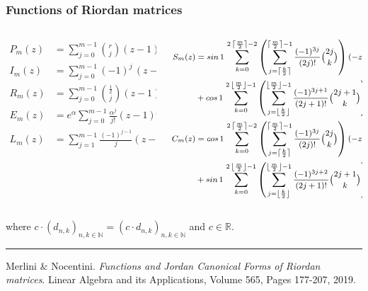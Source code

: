 \documentclass[9pt]{beamer}
\begin{document}
\begin{frame}[fragile]
\frametitle{Functions of Riordan matrices}
\begin{columns}
    \begin{column}{0.35\textwidth}
        \begin{displaymath}
        \begin{split}
          P_{m}(z) &= \sum_{j=0}^{m-1}{\binom{r}{j}}{(z-1)^{j} }\\
          I_{m}(z) &= \sum_{j=0}^{m-1}{(-1)^{j}\,\left(z-1\right)^{j}}\\
          R_{m}(z) &= \sum_{j=0}^{m-1}{{\frac{1}{2} \choose j}\left(z-1\right)^{j}}\\
          E_{m}(z) &= e^{\alpha} \sum_{j=0}^{m-1}{\frac{\alpha^{j}}{j!}\left(z-1\right)^{j}}\\
          L_{m}(z) &= \sum_{j=1}^{m-1}{\frac{(-1)^{j-1}}{j}{\left(z-1\right)^{j} }}\\
        \end{split}
        \end{displaymath}
    \end{column}
    \vrule{}
    \begin{column}{0.65\textwidth}
        \begin{displaymath}
        \footnotesize
        \begin{split}
          S_{m}(z)  &= sin\,{1}\,\sum_{k=0}^{2\,\left\lceil \frac{m}{2} \right\rceil-2}{\left(\sum_{j=\left\lceil \frac{k}{2}\right\rceil}^{\left\lceil \frac{m}{2} \right\rceil -1}{\frac{(-1)^{3j}}{(2j)!}{2j\choose k}}\right) {(-z)^{k}}}\\
                    &+ cos\,{1}\,\sum_{k=0}^{2\,\left\lfloor \frac{m}{2} \right\rfloor-1}{\left(\sum_{j=\left\lfloor \frac{k}{2}\right\rfloor}^{\left\lfloor \frac{m}{2} \right\rfloor -1}{\frac{(-1)^{3j+1}}{(2j + 1)!} {2j+1\choose k}}\right){(-z)^{k}}}\\
          C_{m}(z)  &= cos\,{1}\,\sum_{k=0}^{2\,\left\lceil \frac{m}{2} \right\rceil-2}{\left(\sum_{j=\left\lceil \frac{k}{2}\right\rceil}^{\left\lceil \frac{m}{2} \right\rceil -1}{\frac{(-1)^{3j}}{(2j)!}{2j\choose k}}\right) {(-z)^{k}}}\\
                    &+ sin\,{1}\,\sum_{k=0}^{2\,\left\lfloor \frac{m}{2} \right\rfloor-1}{\left(\sum_{j=\left\lfloor \frac{k}{2}\right\rfloor}^{\left\lfloor \frac{m}{2} \right\rfloor -1}{\frac{(-1)^{3j+2}}{(2j + 1)!} {2j+1\choose k}}\right){(-z)^{k}}}\\
        \end{split}
        \end{displaymath}
    \end{column}
\end{columns}
where $c\cdot(d_{n,k})_{n,k\in\mathbb{N}} = (c\cdot d_{n,k})_{n,k\in\mathbb{N}}$
and $c\in\mathbb{R}$.
\vfill
\noindent\rule{\textwidth}{0.1pt}
{\footnotesize
Merlini \& Nocentini. \textit{Functions and Jordan Canonical Forms of Riordan
matrices}. \newline Linear Algebra and its Applications, Volume 565, Pages 177-207, 2019.}
\end{frame}
\end{document}
